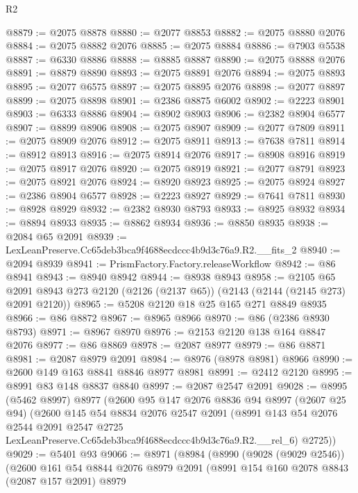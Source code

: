 \begin{lexlean}{R2}
\begin{coremodule}
@8879 := @2075 @8878
@8880 := @2077 @8853
@8882 := @2075 @8880 @2076
@8884 := @2075 @8882 @2076
@8885 := @2075 @8884
@8886 := @7903 @5538
@8887 := @6330 @8886
@8888 := @8885 @8887
@8890 := @2075 @8888 @2076
@8891 := @8879 @8890
@8893 := @2075 @8891 @2076
@8894 := @2075 @8893
@8895 := @2077 @6575
@8897 := @2075 @8895 @2076
@8898 := @2077 @8897
@8899 := @2075 @8898
@8901 := @2386 @8875 @6002
@8902 := @2223 @8901
@8903 := @6333 @8886
@8904 := @8902 @8903
@8906 := @2382 @8904 @6577
@8907 := @8899 @8906
@8908 := @2075 @8907
@8909 := @2077 @7809
@8911 := @2075 @8909 @2076
@8912 := @2075 @8911
@8913 := @7638 @7811
@8914 := @8912 @8913
@8916 := @2075 @8914 @2076
@8917 := @8908 @8916
@8919 := @2075 @8917 @2076
@8920 := @2075 @8919
@8921 := @2077 @8791
@8923 := @2075 @8921 @2076
@8924 := @8920 @8923
@8925 := @2075 @8924
@8927 := @2386 @8904 @6577
@8928 := @2223 @8927
@8929 := @7641 @7811
@8930 := @8928 @8929
@8932 := @2382 @8930 @8793
@8933 := @8925 @8932
@8934 := @8894 @8933
@8935 := @8862 @8934
@8936 := @8850 @8935
@8938 := @2084 @65 @2091
@8939 := LexLeanPreserve.Cc65deb3bca9f4688ecdccc4b9d3c76a9.R2.__fits_2
@8940 := @2094 @8939
@8941 := PrismFactory.Factory.releaseWorkflow
@8942 := @86 @8941
@8943 := @8940 @8942
@8944 := @8938 @8943
@8958 := @2105
    @65
    @2091
    @8943
    @273
    @2120
    (@2126 (@2137 @65))
    (@2143 (@2144 (@2145 @273) @2091 @2120))
@8965 := @5208 @2120 @18 @25 @165 @271 @8849 @8935
@8966 := @86 @8872
@8967 := @8965 @8966
@8970 := @86 (@2386 @8930 @8793)
@8971 := @8967 @8970
@8976 := @2153 @2120 @138 @164 @8847 @2076
@8977 := @86 @8869
@8978 := @2087 @8977
@8979 := @86 @8871
@8981 := @2087 @8979 @2091
@8984 := @8976 (@8978 @8981) @8966
@8990 := @2600 @149 @163 @8841 @8846 @8977 @8981
@8991 := @2412 @2120
@8995 := @8991 @83 @148 @8837 @8840
@8997 := @2087 @2547 @2091
@9028 := @8995
    (@5462 @8997)
    @8977
    (@2600
      @95
      @147
      @2076
      @8836
      @94
      @8997
      (@2607 @25 @94)
      (@2600
        @145
        @54
        @8834
        @2076
        @2547
        @2091
        (@8991
          @143
          @54
          @2076
          @2544
          @2091
          @2547
          @2725
          LexLeanPreserve.Cc65deb3bca9f4688ecdccc4b9d3c76a9.R2.__rel_6)
        @2725))
@9029 := @5401 @93
@9066 := @8971
    (@8984
      (@8990
        (@9028 (@9029 @2546))
        (@2600
          @161
          @54
          @8844
          @2076
          @8979
          @2091
          (@8991
            @154
            @160
            @2078
            @8843
            (@2087 @157 @2091)
            @8979

\end{coremodule}
\end{lexlean}
